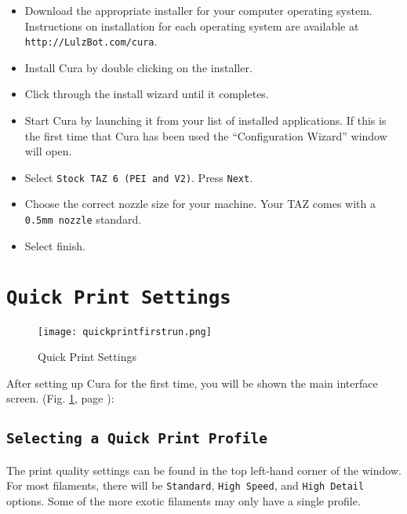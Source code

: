 \begin{itemize}
\item Download the appropriate installer for your computer operating system. Instructions on installation for each operating system are available at \texttt{http://LulzBot.com/cura}.
\item Install Cura by double clicking on the installer.
\item Click through the install wizard until it completes.
\item Start Cura by launching it from your list of installed applications. If this is the first time that Cura has been used the ``Configuration Wizard'' window will open.
\item Select \texttt{Stock TAZ 6 (PEI and V2)}. Press \texttt{Next}.
\item Choose the correct nozzle size for your machine. Your TAZ comes with a \texttt{0.5mm nozzle} standard.
\item Select finish.
\end{itemize}




\section{\texttt{Quick Print Settings}}
\begin{figure}[H]
\centering
\texttt{[image: quickprintfirstrun.png]}
\caption{Quick Print Settings}
\label{fig:Cura}
\end{figure} 
After setting up Cura for the first time, you will be shown the main interface screen. (Fig. \ref{fig:Cura}, page \pageref{fig:Cura}): 

\subsection{\texttt{Selecting a Quick Print Profile}}
The print quality settings can be found in the top left-hand corner of the window. For most filaments, there will be \texttt{Standard}, \texttt{High Speed}, and \texttt{High Detail} options. Some of the more exotic filaments may only have a single profile.

